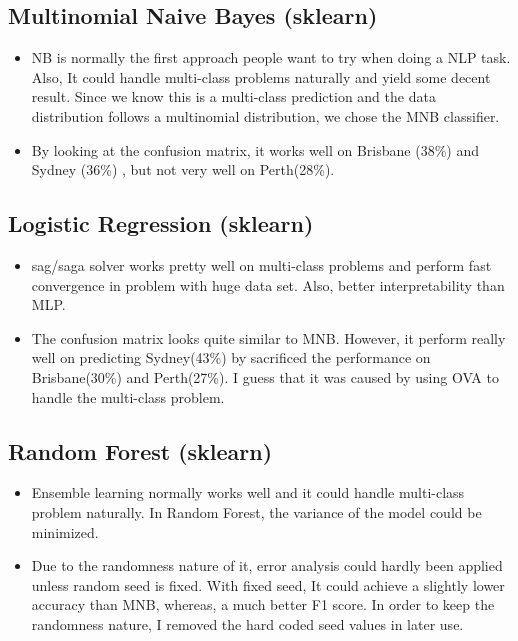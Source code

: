 \documentclass[11pt]{article}
\begin{document}
\subsection{Multinomial Naive Bayes (sklearn)}
\begin{itemize}
      \item NB is normally the first approach people 
            want to try when doing a NLP task. Also, It could handle multi-class
            problems naturally and yield some decent result. Since we know this
            is a multi-class prediction and the data distribution follows a multinomial
            distribution, we chose the MNB classifier.
      \item By looking at the confusion matrix, it works well on Brisbane (38\%) and Sydney (36\%)
            , but not very well on Perth(28\%).
\end{itemize}

\subsection{Logistic Regression (sklearn)}
\begin{itemize}
      \item sag/saga solver works pretty well on 
            multi-class problems and perform fast convergence in problem with huge data set.
            Also, better interpretability than MLP.
      \item The confusion matrix looks quite similar to MNB. However, it perform really well on 
            predicting Sydney(43\%) by sacrificed the performance on Brisbane(30\%) and 
            Perth(27\%). I guess that it was caused by using OVA to handle the multi-class problem.
\end{itemize}

\subsection{Random Forest (sklearn)}
\begin{itemize}
      \item Ensemble learning normally works well and 
            it could handle multi-class problem naturally. In Random Forest, the
            variance of the model could be minimized.
      \item Due to the randomness nature of it, error analysis could hardly been applied 
            unless random seed is fixed. With fixed seed, It could achieve a slightly lower accuracy than
            MNB, whereas, a much better F1 score. In order to keep the randomness nature, I removed the
            hard coded seed values in later use.
\end{itemize}
\end{document}
